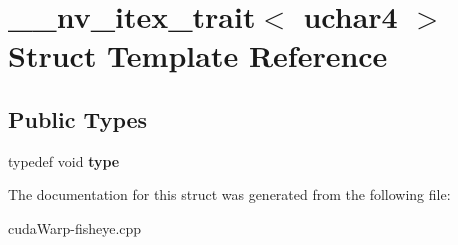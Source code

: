 \hypertarget{struct____nv__itex__trait_3_01uchar4_01_4}{}\section{\+\_\+\+\_\+nv\+\_\+itex\+\_\+trait$<$ uchar4 $>$ Struct Template Reference}
\label{struct____nv__itex__trait_3_01uchar4_01_4}
\subsection*{Public Types}
\begin{DoxyCompactItemize}
\item 
typedef void {\bfseries type}\hypertarget{struct____nv__itex__trait_3_01uchar4_01_4_a4113dc041c61d2e978ce763ae7eaf7ef}{}\label{struct____nv__itex__trait_3_01uchar4_01_4_a4113dc041c61d2e978ce763ae7eaf7ef}

\end{DoxyCompactItemize}


The documentation for this struct was generated from the following file\+:\begin{DoxyCompactItemize}
\item 
cuda\+Warp-\/fisheye.\+cpp\end{DoxyCompactItemize}
